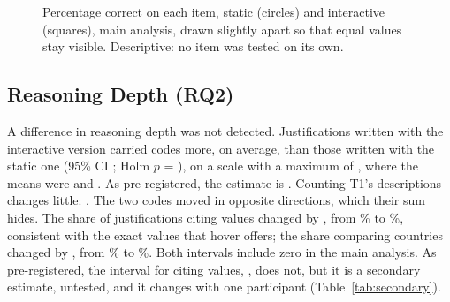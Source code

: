 \documentclass[10pt,twocolumn]{article}
\begin{document}
\begin{table}[t]
    \centering
    \footnotesize
    
    \caption{
        Accuracy and median time by item and version, main analysis; Appendix~\ref{app:preregistered} gives the table as pre-registered. Each row pools forms A and B. No item was tested on its own. Median times are over every answer whose time was recorded, the longest ones trimmed from the time analysis among them.
    }
    \label{tab:items}
\end{table}

\begin{figure}[t]
    \centering
    
    \caption{
        Percentage correct on each item, static (circles) and interactive (squares), main analysis, drawn slightly apart so that equal values stay visible. Descriptive: no item was tested on its own.
    }
    \label{fig:items}
\end{figure}

\subsection{Reasoning Depth (RQ2)}
\label{sec:depth}

A difference in reasoning depth was not detected. Justifications written with the interactive version carried  codes more, on average, than those written with the static one (95\% CI ; Holm $p$ = ), on a scale with a maximum of , where the means were  and . As pre-registered, the estimate is  . Counting T1's descriptions changes little:  . The two codes moved in opposite directions, which their sum hides. The share of justifications citing values changed by , from \% to \%, consistent with the exact values that hover offers; the share comparing countries changed by , from \% to \%. Both intervals include zero in the main analysis. As pre-registered, the interval for citing values, , does not, but it is a secondary estimate, untested, and it changes with one participant (Table~\ref{tab:secondary}).
\end{document}
